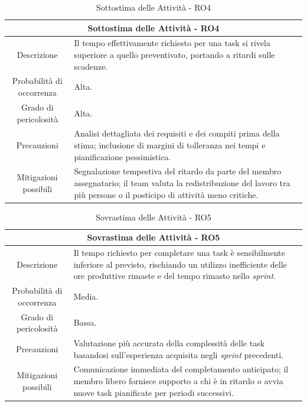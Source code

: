 \documentclass[12pt, a4paper]{article}
\begin{document}
\begin{table}[H]
    \centering
    \renewcommand{\arraystretch}{1.3}
    \begin{tabularx}{\textwidth}{|c|X|}
        \hline
        \multicolumn{2}{|c|}{\textbf{Sottostima delle Attività - RO4}} \\ \hline
        Descrizione &
        Il tempo effettivamente richiesto per una task si rivela superiore a quello preventivato, portando a ritardi sulle scadenze.
        \\ \hline
        Probabilità di occorrenza & Alta.
        \\ \hline
        Grado di pericolosità & Alta.
        \\ \hline
        Precauzioni &
        Analisi dettagliata dei requisiti e dei compiti prima della stima;
        inclusione di margini di tolleranza nei tempi e pianificazione pessimistica.
        \\ \hline
        Mitigazioni possibili & 
        Segnalazione tempestiva del ritardo da parte del membro assegnatario;
        il team valuta la redistribuzione del lavoro tra più persone o il posticipo di attività meno critiche.\\ \hline
    \end{tabularx}
    \caption{Sottostima delle Attività - RO4}
\end{table}

\begin{table}[H]
    \centering
    \renewcommand{\arraystretch}{1.3}
    \begin{tabularx}{\textwidth}{|c|X|}
        \hline
        \multicolumn{2}{|c|}{\textbf{Sovrastima delle Attività - RO5}} \\ \hline
        Descrizione &
        Il tempo richiesto per completare una 
task è sensibilmente inferiore al
        previsto, rischiando un utilizzo inefficiente delle ore produttive
        rimaste e del tempo rimasto nello \textit{sprint}.
\\ \hline
        Probabilità di occorrenza & Media.
\\ \hline
        Grado di pericolosità & Bassa.
\\ \hline
        Precauzioni & Valutazione più accurata della complessità delle task basandosi sull'esperienza acquisita negli \textit{sprint} precedenti.
\\ \hline
        Mitigazioni possibili & 
        Comunicazione immediata del completamento anticipato;
il membro libero
        fornisce supporto a chi è in ritardo o avvia nuove task pianificate per
        periodi successivi.\\ \hline
    \end{tabularx}
    \caption{Sovrastima delle Attività - RO5}
\end{table}
\end{document}
